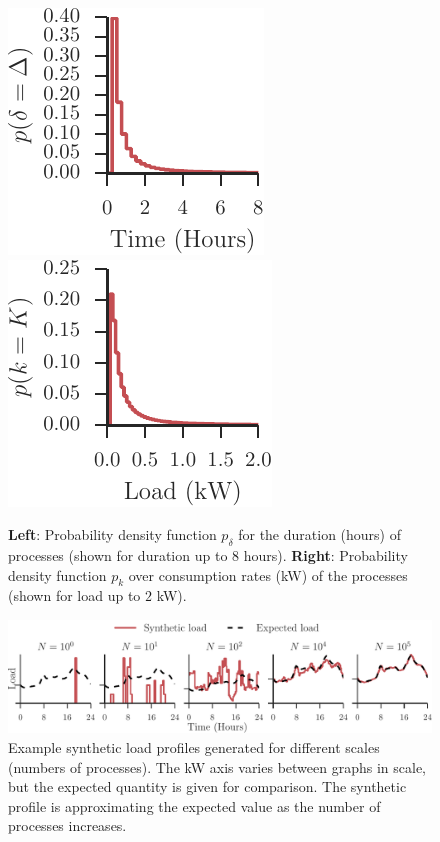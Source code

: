\documentclass[conference]{IEEEtran}
\begin{document}

\begin{figure}[b!]
\centering
\includegraphics[width=0.45\columnwidth]{figures/delta.pdf}~\includegraphics[width=0.45\columnwidth]{figures/kappa.pdf}
\caption{\textbf{Left}: Probability density function $p_{\delta}$ for the duration (hours) of processes (shown for duration up to $8$ hours). \textbf{Right}: Probability density function $p_k$ over consumption rates (kW) of the processes (shown for load up to $2$ kW).}
\label{fig:devide-time-consumption}
\end{figure} 

\begin{figure}[t]
\centering
\includegraphics[]{figures/slps.pdf}
\caption{Example synthetic load profiles generated for different scales (numbers of processes). The kW axis varies between graphs in scale, but the expected quantity is given for comparison. The synthetic profile is approximating the expected value as the number of processes increases.}
\label{fig:art_slps}
\end{figure}
\end{document}
